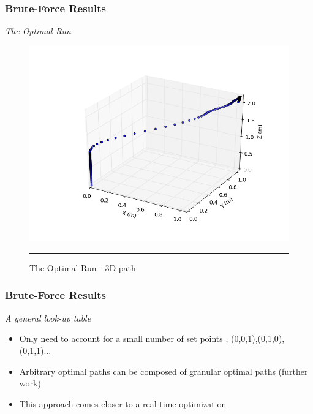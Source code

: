 \documentclass{beamer}
\begin{document}
\begin{frame}

\frametitle{Brute-Force Results}

\textit{The Optimal Run}
\vspace{-6mm}
\begin{figure}[htbp]
	\centering
		\includegraphics[width=\textwidth]{Figures/optimal_run_3D_path.png}
		\rule{35em}{0.5pt}
	\caption[optimal run 3D path]{The Optimal Run - 3D path}
	\label{fig:optimal run 3D path}
\end{figure}

\end{frame}



\begin{frame}

\frametitle{Brute-Force Results}

\textit{A general look-up table }
\begin{itemize}
\item Only need to account for a small number of set points , (0,0,1),(0,1,0),(0,1,1)...
\item Arbitrary optimal paths can be composed of granular optimal paths (further work)
\item This approach comes closer to a real time optimization
\end{itemize}

\end{frame}
\end{document}
